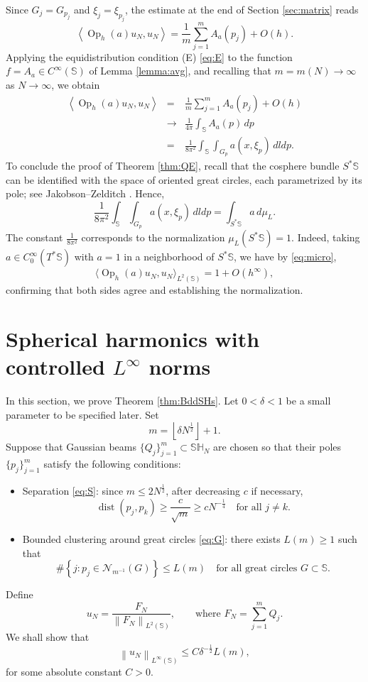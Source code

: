 \documentclass[12pt,reqno]{amsart}
\DeclareMathOperator{\dist}{dist}
\DeclareMathOperator{\Op}{Op}
\newcommand{\Nc}{\mathcal{N}}
\newcommand{\Sb}{\mathbb{S}}
\newcommand{\SH}{\mathbb{SH}}
\theoremstyle{plain}
\theoremstyle{definition}
\theoremstyle{remark}
\numberwithin{equation}{section}
\begin{document}
Since $G_j=G_{p_j}$ and $\xi_j=\xi_{p_j}$, the estimate at the end of Section \ref{sec:matrix} reads
$$\left\langle\Op_h(a)u_N,u_N\right\rangle=\frac1m\sum_{j=1}^mA_a\left(p_j\right)+O(h).$$
Applying the equidistribution condition (E) \eqref{eq:E} to the function $f=A_a\in C^\infty(\Sb)$ of Lemma \ref{lemma:avg}, and recalling that $m=m(N)\to\infty$ as $N\to\infty$, we obtain
\begin{eqnarray*}
\left\langle\Op_h(a)u_N,u_N\right\rangle&=&\frac1m\sum_{j=1}^mA_a\left(p_j\right)+O(h)\\
&\to&\frac{1}{4\pi}\int_\Sb A_a(p)\,dp\\
&=&\frac{1}{8\pi^2}\int_\Sb\int_{G_p}a\left(x,\xi_p\right)\,dldp.
\end{eqnarray*}
To conclude the proof of Theorem \ref{thm:QE}, recall that the cosphere bundle $S^*\Sb$ can be identified with the space of oriented great circles, each parametrized by its pole; see Jakobson–Zelditch \cite[Section 3]{JZ}. Hence,
$$\frac{1}{8\pi^2}\int_{\Sb}\int_{G_p}a\left(x,\xi_p\right)\,dldp=\int_{S^*\Sb}a\,d\mu_L.$$
The constant $\frac{1}{8\pi^2}$ corresponds to the normalization $\mu_L(S^*\Sb)=1$. Indeed, taking $a\in C^\infty_0(T^*\Sb)$ with $a=1$ in a neighborhood of $S^*\Sb$, we have by \eqref{eq:micro},
$$\langle\Op_h(a)u_N,u_N\rangle_{L^2(\Sb)}=1+O(h^\infty),$$
confirming that both sides agree and establishing the normalization.

\section{Spherical harmonics with controlled $L^\infty$ norms}\label{sec:BddSHs}
In this section, we prove Theorem \ref{thm:BddSHs}. Let $0<\delta<1$ be a small parameter to be specified later. Set
\begin{equation}\label{eq:m}
m=\left\lfloor\delta N^{\frac12}\right\rfloor+1.
\end{equation}
Suppose that Gaussian beams $\{Q_j\}_{j=1}^m\subset\SH_N$ are chosen so that their poles $\{p_j\}_{j=1}^m$ satisfy the following conditions:
\begin{itemize}
\item[(S).] Separation \eqref{eq:S}: since $m\le2N^\frac12$, after decreasing $c$ if necessary,
$$\dist\left(p_j,p_k\right)\ge\frac{c}{\sqrt m}\ge cN^{-\frac14}\quad\text{for all }j\ne k.$$
\item[(G).] Bounded clustering around great circles \eqref{eq:G}: there exists $L(m)\ge1$ such that
$$\#\left\{j:p_j\in\Nc_{m^{-1}}(G)\right\}\le L(m)\quad\text{for all great circles }G\subset\Sb.$$
\end{itemize}
Define
$$u_N=\frac{F_N}{\left\|F_N\right\|_{L^2(\Sb)}},\qquad\text{where }F_N=\sum_{j=1}^mQ_j.$$
We shall show that
$$\left\|u_N\right\|_{L^\infty(\Sb)}\le C\delta^{-\frac12}L(m),$$
for some absolute constant $C>0$.
\end{document}
